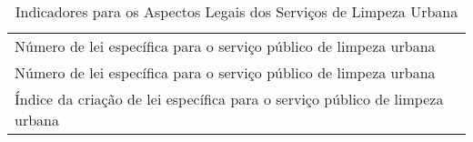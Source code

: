 \begin{table}[htbp]
  \centering
  \caption{Indicadores para os Aspectos Legais dos Serviços de Limpeza Urbana}
    \begin{tabular}{|p{25em}|}
    \rowcolor[rgb]{ .867,  .922,  .969}  
    \multicolumn{1}{P{25em}}{ASPECTOS LEGAIS DOS SERVIÇOS DE LIMPEZA URBANA} \\
    \midrule
    Número de lei específica para o serviço público de limpeza urbana \\
    \midrule
    Número de lei específica para o serviço público de limpeza urbana \\
    \midrule
    Índice da criação de lei específica para o serviço público de limpeza urbana \\
    \bottomrule
    \end{tabular}%
  \label{tab:ind_legal}%
\end{table}%
